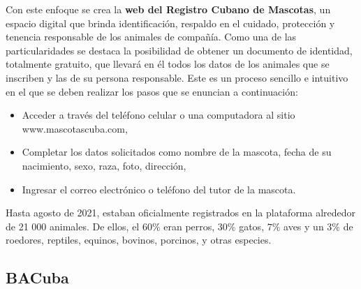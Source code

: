 Con este enfoque se crea la \textbf{web del Registro Cubano de Mascotas}, un espacio digital que brinda identificación, respaldo en el cuidado, protección y tenencia responsable de los animales de compañía. Como una de las particularidades se destaca la posibilidad de obtener un documento de identidad, totalmente gratuito, que llevará en él todos los datos de los animales que se inscriben y las de su persona responsable. Este es un proceso sencillo e intuitivo en el que se deben realizar los pasos que se enuncian a continuación:
\begin{itemize}
	\item Acceder a través del teléfono celular o una computadora al sitio www.mascotascuba.com,
	\item Completar los datos solicitados como nombre de la mascota, fecha de su nacimiento, sexo, raza, foto, dirección,
	\item Ingresar el correo electrónico o teléfono del tutor de la mascota.
\end{itemize}
Hasta agosto de 2021, estaban oficialmente registrados en la plataforma alrededor de 21 000 animales. De ellos, el $60 \%$ eran perros, $30 \%$ gatos, $7 \%$ aves y un $3 \%$ de roedores, reptiles, equinos, bovinos, porcinos, y otras especies.

\subsection{BACuba}\label{chapter:bacuba}

%		

